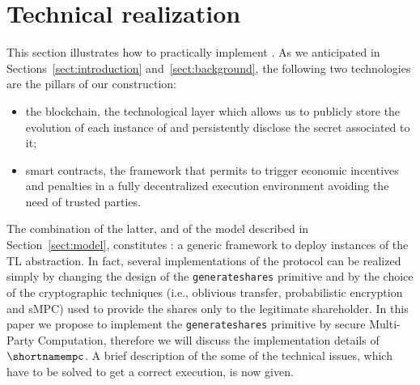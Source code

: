 \section{Technical realization}\label{sect:realization}

This section illustrates how to practically implement \shortname. 
\newline
As we anticipated in Sections~\ref{sect:introduction} and~\ref{sect:background}, the following two technologies are the pillars of our construction:
\begin{itemize}
	\item the blockchain, the technological layer which allows us to publicly store the evolution of each instance of \shortname and persistently disclose the secret associated to it;
	\item smart contracts, the framework that permits to trigger economic incentives and penalties in a fully decentralized execution environment avoiding the need of trusted parties.
\end{itemize}
The combination of the latter, and of the model described in Section~\ref{sect:model}, constitutes \shortname: a generic framework to deploy instances of the TL abstraction.
In fact, several implementations of the \shortname protocol can be realized simply by changing the design of the \texttt{generate\textunderscore shares} primitive and by the choice of the cryptographic techniques (i.e., oblivious transfer, probabilistic encryption and sMPC) used to provide the shares only to the legitimate shareholder.
In this paper we propose to implement the \texttt{generate\textunderscore shares} primitive by secure Multi-Party Computation, therefore we will discuss the implementation details of $\shortnamempc$. 
A brief description of the some of the technical issues, which have to be solved to get a correct execution, is now given. 

